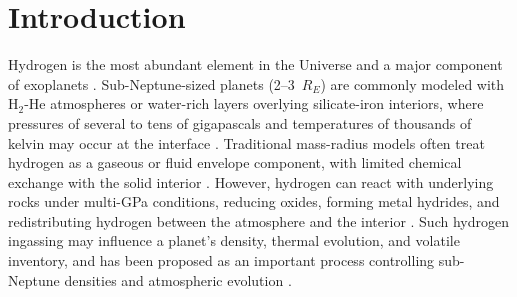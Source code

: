 \documentclass[draft,jgrga,12pt]{agujournal2019}
\begin{document}

\section{Introduction}

Hydrogen is the most abundant element in the Universe and a major component of exoplanets \cite{wolfgang_how_2015, jontof-hutter_secure_2016, young_earth_2023}. 
Sub-Neptune-sized planets (2--3~$R_E$) are commonly modeled with H$_2$-He atmospheres or water-rich layers overlying silicate-iron interiors, where pressures of several to tens of gigapascals and temperatures of thousands of kelvin may occur at the interface \cite{kite_atmosphere_2020, schlichting_chemical_2022}. 
Traditional mass-radius models often treat hydrogen as a gaseous or fluid envelope component, with limited chemical exchange with the solid interior \cite{leger_new_2004, rogers_formation_2011, howe_massradius_2014}. 
However, hydrogen can react with underlying rocks under multi-GPa conditions, reducing oxides, forming metal hydrides, and redistributing hydrogen between the atmosphere and the interior \cite{olson_nebular_2019, kite_atmosphere_2020, young_earth_2023, kim_stability_2023, horn_reaction_2023}. 
Such hydrogen ingassing may influence a planet's density, thermal evolution, and volatile inventory, and has been proposed as an important process controlling sub-Neptune densities and atmospheric evolution \cite{olson_nebular_2019, kite_atmosphere_2020, schlichting_chemical_2022, young_phase_2024}. 
\end{document}

